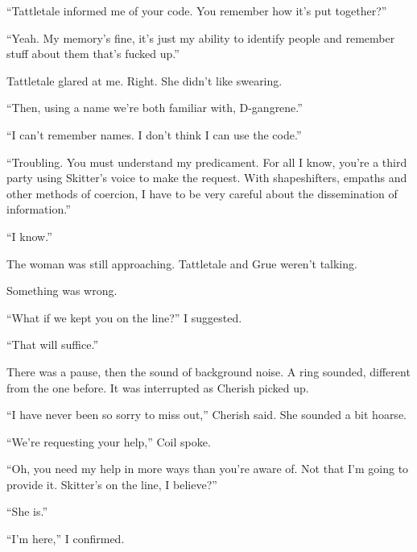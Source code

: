 ``Tattletale informed me of your code.  You remember how it's put together?''



``Yeah.  My memory's fine, it's just my ability to identify people and remember stuff about them that's fucked up.''



Tattletale glared at me.  Right.  She didn't like swearing.



``Then, using a name we're both familiar with, D-gangrene.''



``I can't remember names.  I don't think I can use the code.''



``Troubling.  You must understand my predicament.  For all I know, you're a third party using Skitter's voice to make the request.  With shapeshifters, empaths and other methods of coercion, I have to be very careful about the dissemination of information.''



``I know.''



The woman was still approaching.  Tattletale and Grue weren't talking.



Something was wrong.



``What if we kept you on the line?''  I suggested.



``That will suffice.''



There was a pause, then the sound of background noise.  A ring sounded, different from the one before.  It was interrupted as Cherish picked up.



``I have never been so sorry to miss out,'' Cherish said.  She sounded a bit hoarse.



``We're requesting your help,'' Coil spoke.



``Oh, you need my help in more ways than you're aware of.  Not that I'm going to provide it.  Skitter's on the line, I believe?''



``She is.''



``I'm here,'' I confirmed.



